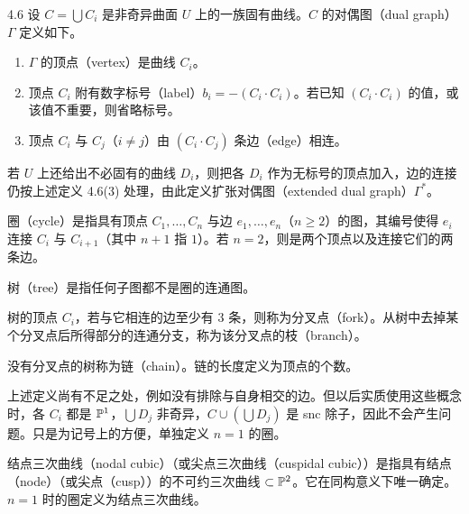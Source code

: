 \begin{definition}{4.6}
设 $C=\bigcup C_i$ 是非奇异曲面 $U$ 上的一族固有曲线。$C$ 的对偶图（dual graph）$\Gamma$ 定义如下。
\begin{enumerate}[label=(\arabic*),leftmargin=*]
\item $\Gamma$ 的顶点（vertex）是曲线 $C_i$。
\item 顶点 $C_i$ 附有数字标号（label）$b_i=-(C_i\cdot C_i)$。若已知 $(C_i\cdot C_i)$ 的值，或该值不重要，则省略标号。
\item 顶点 $C_i$ 与 $C_j$（$i\ne j$）由 $(C_i\cdot C_j)$ 条边（edge）相连。
\end{enumerate}
若 $U$ 上还给出不必固有的曲线 $D_i$，则把各 $D_i$ 作为无标号的顶点加入，边的连接仍按上述定义 4.6(3) 处理，由此定义扩张对偶图（extended dual graph）$\Gamma^*$。


圈（cycle）是指具有顶点 $C_1,\dots,C_n$ 与边 $e_1,\dots,e_n$（$n\ge 2$）的图，其编号使得 $e_i$ 连接 $C_i$ 与 $C_{i+1}$（其中 $n+1$ 指 $1$）。若 $n=2$，则是两个顶点以及连接它们的两条边。

树（tree）是指任何子图都不是圈的连通图。

树的顶点 $C_i$，若与它相连的边至少有 $3$ 条，则称为分叉点（fork）。从树中去掉某个分叉点后所得部分的连通分支，称为该分叉点的枝（branch）。

没有分叉点的树称为链（chain）。链的长度定义为顶点的个数。

上述定义尚有不足之处，例如没有排除与自身相交的边。但以后实质使用这些概念时，各 $C_i$ 都是 $\mathbb{P}^1$，$\bigcup D_j$ 非奇异，$C\cup(\bigcup D_j)$ 是 snc 除子，因此不会产生问题。只是为记号上的方便，单独定义 $n=1$ 的圈。

结点三次曲线（nodal cubic）（或尖点三次曲线（cuspidal cubic））是指具有结点（node）（或尖点（cusp））的不可约三次曲线 $\subset\mathbb{P}^2$。它在同构意义下唯一确定。$n=1$ 时的圈定义为结点三次曲线。
\end{definition}

